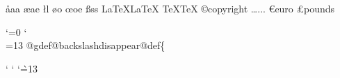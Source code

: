 {{{  \commondummyword\aa               {aa}%
  \commondummyword\ae               {ae}%
  \commondummyword{}%
  \commondummyword\exclamdown       {!}%
  \commondummyword\l                {l}%
  \commondummyword\o                {o}%
  \commondummyword\oe               {oe}%
  \commondummyword{}%
  \commondummyword{}%
  \commondummyword{}%
  \commondummyword\ss               {ss}%
  \commondummyword{}%
  \commondummyword\LaTeX            {LaTeX}%
  \commondummyword\TeX              {TeX}%
  \commondummyword\ampchar          {\normalamp}%
  \commondummyword\atchar           {\@}%
  \commondummyword\arrow            {->}%
  \commondummyword\backslashchar    {\realbackslash}%
  \commondummyword{}%
  \commondummyword\comma            {,}%
  \commondummyword\copyright        {copyright}%
  \commondummyword\dots             {...}%
  \commondummyword{}%
  \commondummyword\entrybreak       {}%
  \commondummyword\equiv            {===}%
  \commondummyword{}%
  \commondummyword\euro             {euro}%
  \commondummyword\expansion        {==>}%
  \commondummyword\geq              {>=}%
  \commondummyword\guillemetleft    {<<}%
  \commondummyword\guillemetright   {>>}%
  \commondummyword\guilsinglleft    {<}%
  \commondummyword\guilsinglright   {>}%
  \commondummyword\lbracechar       {\{}%
  \commondummyword\leq              {<=}%
  \commondummyword{}%
  \commondummyword\minus            {-}%
  \commondummyword\pounds           {pounds}%
  \commondummyword{}%
  \commondummyword\print            {-|}%
  \commondummyword{}%
  \commondummyword{}%
  \commondummyword{}%
  \commondummyword{}%
  \commondummyword{}%
  \commondummyword\quotesinglbase   {,}%
  \commondummyword\rbracechar       {\}}%
  \commondummyword{}%
  \commondummyword\result           {=>}%
  \commondummyword\sub              {}%
  \commondummyword\sup              {}%
  \commondummyword{}%
}

\let\indexlbrace\relax
\let\indexrbrace\relax
\let\indexatchar\relax
\let\indexbackslash\relax

{\catcode`\@=0
\catcode`\\=13
  @gdef@backslashdisappear{@def\{}}
}

{
\catcode`
\catcode`
\catcode`\`=13
  \gdef\indexnonalnumdisappear{%
    \ifflagclear{txiindexlquoteignore}{}{%
      \let`=\empty
    }%
    \ifflagclear{txiindexbackslashignore}{}{%
      \backslashdisappear
    }%
    \ifflagclear{txiindexhyphenignore}{}{%
      \def-{}%
    }%
    \ifflagclear{txiindexlessthanignore}{}{%
      \def<{}%
    }%
    \ifflagclear{txiindexatsignignore}{}{%
      \def\@{}%
    }%
  }

}}
